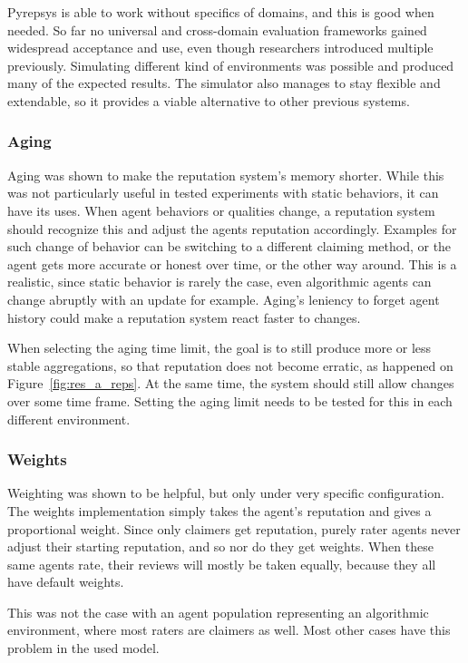 \documentclass[%
    ]{\PathToTumTemplate/thesis/tum_thesis}
\begin{document}
Pyrepsys is able to work without specifics of domains, and this is good when needed.
So far no universal and cross-domain evaluation frameworks gained widespread acceptance and use, even though researchers introduced multiple previously.
Simulating different kind of environments was possible and produced many of the expected results.
The simulator also manages to stay flexible and extendable, so it provides a viable alternative to other previous systems.


\subsubsection{Aging}
Aging was shown to make the reputation system's memory shorter.
While this was not particularly useful in tested experiments with static behaviors, it can have its uses.
When agent behaviors or qualities change, a reputation system should recognize this and adjust the agents reputation accordingly.
Examples for such change of behavior can be switching to a different claiming method, or the agent gets more accurate or honest over time, or the other way around.
This is a realistic, since static behavior is rarely the case, even algorithmic agents can change abruptly with an update for example.
Aging's leniency to forget agent history could make a reputation system react faster to changes.

When selecting the aging time limit, the goal is to still produce more or less stable aggregations, so that reputation does not become erratic, as happened on Figure~\ref{fig:res_a_reps}.
At the same time, the system should still allow changes over some time frame.
Setting the aging limit needs to be tested for this in each different environment.

\subsubsection{Weights}
Weighting was shown to be helpful, but only under very specific configuration.
The weights implementation simply takes the agent's reputation and gives a proportional weight.
Since only claimers get reputation, purely rater agents never adjust their starting reputation, and so nor do they get weights.
When these same agents rate, their reviews will mostly be taken equally, because they all have default weights.

This was not the case with an agent population representing an algorithmic environment, where most raters are claimers as well.
Most other cases have this problem in the used model.
\end{document}
